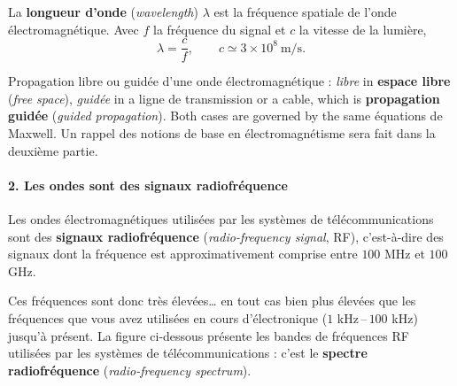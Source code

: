 \begin{definition}
  La \textbf{longueur d'onde} (\textit{wavelength}) $\lambda$ est la fréquence
  spatiale de l'onde électromagnétique. Avec $f$ la fréquence du signal et $c$
  la vitesse de la lumière,
  \[\lambda=\frac{c}{f},\qquad c \simeq 3\times 10^{8}\ \text{m/s}.\]
\end{definition}

Propagation libre ou guidée d'une onde électromagnétique : \textit{libre} in
\textbf{espace libre} (\textit{free space}), \textit{guidée} in a ligne de
transmission or a cable, which is \textbf{propagation guidée} (\textit{guided propagation}). Both
cases are governed by the same équations de Maxwell. Un rappel des notions de
base en électromagnétisme sera fait dans la deuxième partie.

\paragraph{2. Les ondes sont des signaux radiofréquence}
\begin{definition}
  Les ondes électromagnétiques utilisées par les systèmes de télécommunications
  sont des \textbf{signaux radiofréquence} (\textit{radio-frequency signal},
  RF), c'est-à-dire des signaux dont
  la fréquence est approximativement comprise entre $100$ MHz et $100$ GHz.
\end{definition}

Ces fréquences sont donc très élevées… en tout cas bien plus élevées que les
fréquences que vous avez utilisées en cours d'électronique
($1$ kHz\,--\,$100$ kHz) jusqu'à présent. La figure ci-dessous présente les
bandes de fréquences RF utilisées par les systèmes de télécommunications : c'est
le \textbf{spectre radiofréquence} (\textit{radio-frequency spectrum}).

